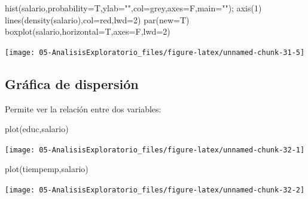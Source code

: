 \documentclass[
]{book}
\newenvironment{Shaded}{\begin{snugshade}}{\end{snugshade}}
\newcommand{\AttributeTok}[1]{\textcolor[rgb]{0.77,0.63,0.00}{#1}}
\newcommand{\DecValTok}[1]{\textcolor[rgb]{0.00,0.00,0.81}{#1}}
\newcommand{\FunctionTok}[1]{\textcolor[rgb]{0.00,0.00,0.00}{#1}}
\newcommand{\NormalTok}[1]{#1}
\newcommand{\StringTok}[1]{\textcolor[rgb]{0.31,0.60,0.02}{#1}}
\theoremstyle{break}
\theoremstyle{nonumberplain}
\begin{document}
\begin{Shaded}
\begin{Highlighting}[]
\FunctionTok{hist}\NormalTok{(salario,}\AttributeTok{probability=}\NormalTok{T,}\AttributeTok{ylab=}\StringTok{""}\NormalTok{,}\AttributeTok{col=}\StringTok{\textquotesingle{}grey\textquotesingle{}}\NormalTok{,}\AttributeTok{axes=}\NormalTok{F,}\AttributeTok{main=}\StringTok{""}\NormalTok{); }\FunctionTok{axis}\NormalTok{(}\DecValTok{1}\NormalTok{)}
\FunctionTok{lines}\NormalTok{(}\FunctionTok{density}\NormalTok{(salario),}\AttributeTok{col=}\StringTok{\textquotesingle{}red\textquotesingle{}}\NormalTok{,}\AttributeTok{lwd=}\DecValTok{2}\NormalTok{)}
\FunctionTok{par}\NormalTok{(}\AttributeTok{new=}\NormalTok{T)}
\FunctionTok{boxplot}\NormalTok{(salario,}\AttributeTok{horizontal=}\NormalTok{T,}\AttributeTok{axes=}\NormalTok{F,}\AttributeTok{lwd=}\DecValTok{2}\NormalTok{)}
\end{Highlighting}
\end{Shaded}

\begin{center}\texttt{[image: 05-AnalisisExploratorio\_files/figure-latex/unnamed-chunk-31-5]} \end{center}

\hypertarget{gruxe1fica-de-dispersiuxf3n}{%
\subsection{Gráfica de dispersión}\label{gruxe1fica-de-dispersiuxf3n}}

Permite ver la relación entre dos variables:

\begin{Shaded}
\begin{Highlighting}[]
\FunctionTok{plot}\NormalTok{(educ,salario)}
\end{Highlighting}
\end{Shaded}

\begin{center}\texttt{[image: 05-AnalisisExploratorio\_files/figure-latex/unnamed-chunk-32-1]} \end{center}

\begin{Shaded}
\begin{Highlighting}[]
\FunctionTok{plot}\NormalTok{(tiempemp,salario)}
\end{Highlighting}
\end{Shaded}

\begin{center}\texttt{[image: 05-AnalisisExploratorio\_files/figure-latex/unnamed-chunk-32-2]} \end{center}
\end{document}
